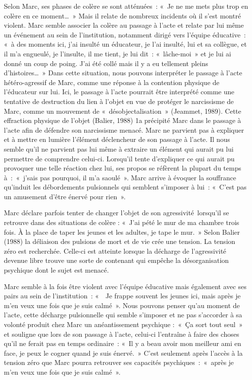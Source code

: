 \documentclass[12pt, a4paper]{book}
\begin{document}
\begin{spacing}{1.5}
Selon Marc, ses phases de colère se sont atténuées : « Je ne me mets plus trop en colère en ce moment… » Mais il relate de nombreux incidents où il s'est montré violent. Marc semble associer la colère au passage à l'acte et relate par lui même un événement au sein de l'institution, notamment dirigé vers l'équipe éducative : « à des moments ici, j'ai insulté un éducateur, je l'ai insulté, lui et sa collègue, et il m'a engueulé, je l'insulte, il me tient, je lui dit : « lâche-moi » et je lui ai donné un coup de poing. J'ai été collé mais il y a eu tellement pleins d'histoires… » Dans cette situation, nous pouvons interpréter le passage à l'acte hétéro-agressif de Marc, comme une réponse à la contention physique de l'éducateur sur lui. Ici, le passage à l'acte pourrait être interprété comme une tentative de destruction du lien à l'objet en vue de protéger le narcissisme de Marc, comme un mouvement de « désobjectalisation » (Jeammet, 1989). Cette effraction physique de l'objet (Balier, 1988) 1a précipité Marc dans le passage à l'acte afin de défendre son narcissisme menacé. Marc ne parvient pas à expliquer et à mettre en lumière l'élément déclencheur de son passage à l'acte. Il nous semble qu'il ne parvient pas lui même à extraire un élément qui aurait pu lui permettre de comprendre celui-ci. Lorsqu'il tente d'expliquer ce qui aurait pu provoquer une telle réaction chez lui, ses propos se réfèrent la plupart du temps à : « j'sais pas pourquoi, il m'a saoulé ». Marc arrive à évoquer la souffrance qu'induit les débordements pulsionnels qui semblent s'imposer à lui : « C'est pas un amusement d'être énervé pour rien ».

Marc déclare parfois tenter de changer l'objet de son agressivité lorsqu'il se retrouve dans des situations de colère : « J'ai pété le mur de ma chambre trois fois. À la place de taper les jeunes et les adultes, je tape le mur. » Selon Balier (1988) la déliaison des pulsions de mort et de vie crée une tension. La tension zéro est recherchée. Celle-ci est atteinte lorsque la décharge de l'agressivité devenue libre trouve une sorte de contenant qui empêche la désorganisation psychique dont le sujet est menacé.  

Marc semble à la fois être violent avec l'équipe éducative mais également avec ses pairs au sein de l'institution : «  Je frappe souvent les jeunes ici, mais après je m'en veux une fois que je suis calmé ». Nous pouvons penser qu'au moment de l'acte, cette décharge pulsionnelle qui semble s'imposer et ne pas s'accorder à sa volonté produit  chez Marc un anéantissement psychique : « Ça sort tout seul » et souligne que lors de son passage à l'acte, celui-ci l'entraîne à faire des choses qu'il ne ferait pas en temps ordinaire : « Il y a beau avoir mon meilleur ami en face, je peux le cogner quand je suis énervé. » C'est seulement après l'accès à la tension zéro que Marc pourra retrouver ses capacités psychiques : « après je m'en veux une fois que je suis calmé ».


\end{spacing}
\end{document}
